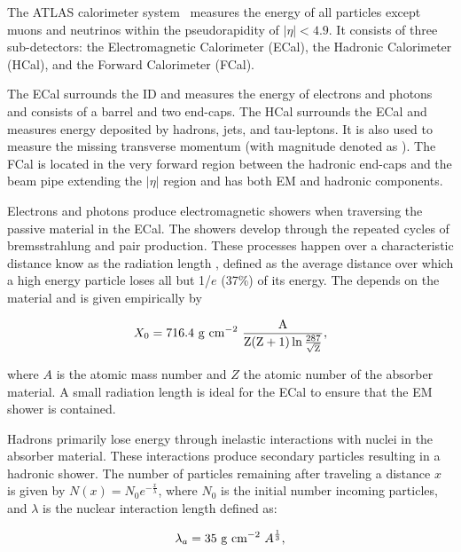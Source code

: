 The ATLAS calorimeter system~\cite{atlas_calorimeter_tdr} measures the energy of all particles except muons and neutrinos within the pseudorapidity of $|\eta| < 4.9$\@. It consists of three sub-detectors: the Electromagnetic Calorimeter (ECal), the Hadronic Calorimeter (HCal), and the Forward Calorimeter (FCal). 

The ECal surrounds the ID and measures the energy of electrons and photons and consists of a barrel and two end-caps. The HCal surrounds the ECal and measures energy deposited by hadrons, jets, and tau-leptons. It is also used to measure the missing transverse momentum (with magnitude denoted as \met). The FCal is located in the very forward region between the hadronic end-caps and the beam pipe extending the $|\eta|$ region and has both EM and hadronic components. 

Electrons and photons produce electromagnetic showers when traversing the passive material in the ECal. The showers develop through the repeated cycles of bremsstrahlung and pair production. These processes happen over a characteristic distance know as the radiation length \radlength{}, defined as the average distance over which a high energy particle loses all but 1/$e$ (37\%) of its energy. The \radlength{} depends on the material and is given empirically by

\begin{equation}
    \centering
    X_{0} = 716.4 \ \mathrm{g \ cm^{-2} \ \frac{A}{Z (Z+1) \ln{\frac{287}{\sqrt{Z}}}}},
    \label{eq:rad_length}
\end{equation}

\noindent{}where $A$ is the atomic mass number and $Z$ the atomic number of the absorber material. A small radiation length is ideal for the ECal to ensure that the EM shower is contained.

Hadrons primarily lose energy through inelastic interactions with nuclei in the absorber material. These interactions produce secondary particles resulting in a hadronic shower. The number of particles remaining after traveling a distance $x$ is given by $N(x) = N_{0} e^{-\frac{x}{\lambda}}$, where $N_{0}$ is the initial number incoming particles, and $\lambda$ is the nuclear interaction length defined as:

\begin{equation}
    \centering
    \lambda_{a} = 35 \ \mathrm{g \ cm^{-2}} \ A^{\frac{1}{3}},
    \label{eq:absorption_length}
\end{equation}

